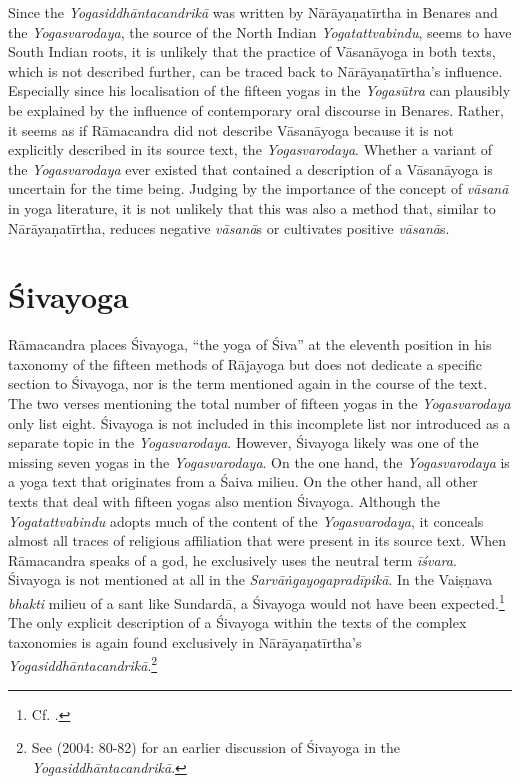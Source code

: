 Since the \emph{Yogasiddhāntacandrikā} was written by Nārāyaṇatīrtha in Benares and the \emph{Yogasvarodaya}, the source of the North Indian \emph{Yogatattvabindu}, seems to have South Indian roots, it is unlikely that the practice of Vāsanāyoga in both texts, which is not described further, can be traced back to Nārāyaṇatīrtha's influence. Especially since his localisation of the fifteen yogas in the \emph{Yogasūtra} can plausibly be explained by the influence of contemporary oral discourse in Benares. Rather, it seems as if Rāmacandra did not describe Vāsanāyoga because it is not explicitly described in its source text, the \emph{Yogasvarodaya}. Whether a variant of the \emph{Yogasvarodaya} ever existed that contained a description of a Vāsanāyoga is uncertain for the time being. Judging by the importance of the concept of \textit{vāsanā} in yoga literature, it is not unlikely that this was also a method that, similar to Nārāyaṇatīrtha, reduces negative \textit{vāsanā}s or cultivates positive \textit{vāsanā}s.

\section{Śivayoga}
\label{sivayogaintro}

Rāmacandra places Śivayoga, ``the yoga of Śiva'' at the eleventh position in his taxonomy of the fifteen methods of Rājayoga but does not dedicate a specific section to Śivayoga, nor is the term mentioned again in the course of the text. The two verses mentioning the total number of fifteen yogas in the \textit{Yogasvarodaya} only list eight. Śivayoga is not included in this incomplete list nor introduced as a separate topic in the \textit{Yogasvarodaya}. However, Śivayoga likely was one of the missing seven yogas in the \textit{Yogasvarodaya}. On the one hand, the \textit{Yogasvarodaya} is a yoga text that originates from a Śaiva milieu. On the other hand, all other texts that deal with fifteen yogas also mention Śivayoga. Although the \textit{Yogatattvabindu} adopts much of the content of the \textit{Yogasvarodaya}, it conceals almost all traces of religious affiliation that were present in its source text. When Rāmacandra speaks of a god, he exclusively uses the neutral term \textit{īśvara}. Śivayoga is not mentioned at all in the \textit{Sarvāṅgayogapradīpikā}. In the Vaiṣṇava \textit{bhakti} milieu of a sant like Sundardā, a Śivayoga would not have been expected.\footnote{Cf. \citeauthor[2023: 7]{horstmann2023shrine}.} The only explicit description of a Śivayoga within the texts of the complex taxonomies is again found exclusively in Nārāyaṇatīrtha's \textit{Yogasiddhāntacandrikā}.\footnote{See \citeauthor{penna2004} (2004: 80-82) for an earlier discussion of Śivayoga in the \textit{Yogasiddhāntacandrikā}.}

